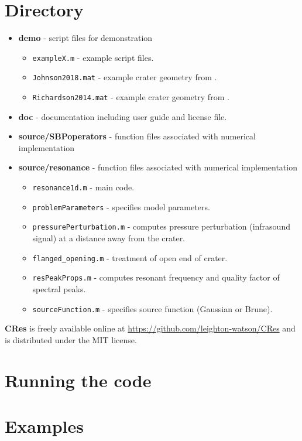 \documentclass[10pt]{article}
\begin{document}
\section{Directory}
\begin{itemize}
\item {\bf demo} - script files for demonstration
\begin{itemize}
\item \texttt{exampleX.m} - example script files.
\item \texttt{Johnson2018.mat} - example crater geometry from \citet{Johnson2018}.
\item \texttt{Richardson2014.mat} - example crater geometry from \citet{Richardson2014}.
\end{itemize}

\item {\bf doc} - documentation including user guide and license file. 
\item{\bf source/SBPoperators} - function files associated with numerical implementation
\item {\bf source/resonance} - function files associated with numerical implementation
\begin{itemize}
\item \texttt{resonance1d.m} - main code.
\item \texttt{problemParameters} - specifies model parameters. 
\item \texttt{pressurePerturbation.m} - computes pressure perturbation (infrasound signal) at a distance away from the crater.
\item \texttt{flanged\_opening.m} - treatment of open end of crater. 
\item \texttt{resPeakProps.m} - computes resonant frequency and quality factor of spectral peaks.
\item \texttt{sourceFunction.m} - specifies source function (Gaussian or Brune).
\end{itemize}
\end{itemize}

{\bf CRes} is freely available online at \href{https://github.com/leighton-watson/CRes}{https://github.com/leighton-watson/CRes} and is distributed under the MIT license. 

\section{Running the code}

\newpage
\section{Examples}
\end{document}
